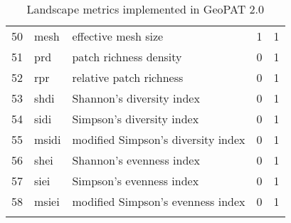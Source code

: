\begin{longtable}{rllrr}
   50 & mesh & effective mesh size &   1 &   1 \\ 
   51 & prd & patch richness density &   0 &   1 \\ 
   52 & rpr & relative patch richness &   0 &   1 \\ 
   53 & shdi & Shannon's diversity index &   0 &   1 \\ 
   54 & sidi & Simpson's diversity index &   0 &   1 \\ 
   55 & msidi & modified Simpson's diversity index &   0 &   1 \\ 
   56 & shei & Shannon's evenness index &   0 &   1 \\ 
   57 & siei & Simpson's evenness index &   0 &   1 \\ 
   58 & msiei & modified Simpson's evenness index &   0 &   1 \\ 
  \hline
\caption{Landscape metrics implemented in GeoPAT 2.0} 
\label{lindtable}
\end{longtable}
